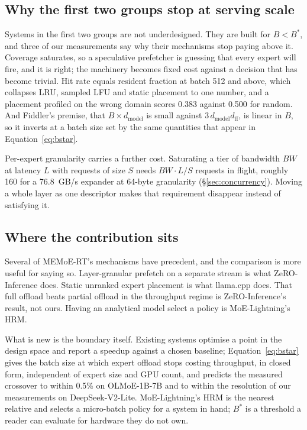 \documentclass[10pt,a4paper]{article}
\begin{document}
\subsection{Why the first two groups stop at serving scale}

Systems in the first two groups are not underdesigned. They are built for
$B<B^{*}$, and three of our measurements say why their mechanisms stop paying
above it. Coverage saturates, so a speculative prefetcher is guessing that every
expert will fire, and it is right; the machinery becomes fixed cost against a
decision that has become trivial. Hit rate equals resident fraction at batch 512
and above, which collapses LRU, sampled LFU and static placement to one number,
and a placement profiled on the wrong domain scores 0.383 against 0.500 for
random. And Fiddler's premise, that $B \times d_{\text{model}}$ is small against
$3\,d_{\text{model}}d_{\text{ff}}$, is linear in $B$, so it inverts at a batch
size set by the same quantities that appear in Equation~\ref{eq:bstar}.

Per-expert granularity carries a further cost. Saturating a tier of bandwidth
$BW$ at latency $L$ with requests of size $S$ needs $BW \cdot L / S$ requests in
flight, roughly 160 for a 76.8~GB/s expander at 64-byte granularity
(\S\ref{sec:concurrency}). Moving a whole layer as one descriptor makes that
requirement disappear instead of satisfying it.

\subsection{Where the contribution sits}

Several of MEMoE-RT's mechanisms have precedent, and the comparison is more useful
for saying so. Layer-granular prefetch on a separate stream is what
ZeRO-Inference does. Static unranked expert placement is what llama.cpp does. That
full offload beats partial offload in the throughput regime is ZeRO-Inference's
result, not ours. Having an analytical model select a policy is MoE-Lightning's
HRM.

What is new is the boundary itself. Existing systems optimise a point in the
design space and report a speedup against a chosen baseline; Equation~\ref{eq:bstar}
gives the batch size at which expert offload stops costing throughput, in closed
form, independent of expert size and GPU count, and predicts the measured
crossover to within 0.5\% on OLMoE-1B-7B and to within the resolution of our
measurements on DeepSeek-V2-Lite. MoE-Lightning's HRM is the nearest relative and
selects a micro-batch policy for a system in hand; $B^{*}$ is a threshold a reader
can evaluate for hardware they do not own.
\end{document}

